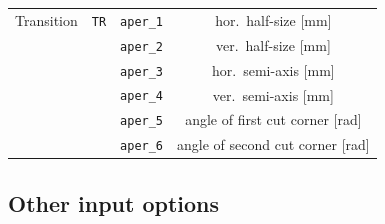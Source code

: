 \begin{center}
\begin{longtable}{|c|c|c|c|}
    Transition & \texttt{TR} & \texttt{aper\_1} & hor.~half-size [mm] \\*
    & & \texttt{aper\_2} & ver.~half-size [mm] \\*
    & & \texttt{aper\_3} & hor.~semi-axis [mm] \\*
    & & \texttt{aper\_4} & ver.~semi-axis [mm] \\*
    & & \texttt{aper\_5} & angle of first cut corner [rad] \\*
    & & \texttt{aper\_6} & angle of second cut corner [rad] \\*
    \hline

\end{longtable}
\end{center}

\bigskip
\subsection{Other input options}\label{ApeLim:inpOptions}

